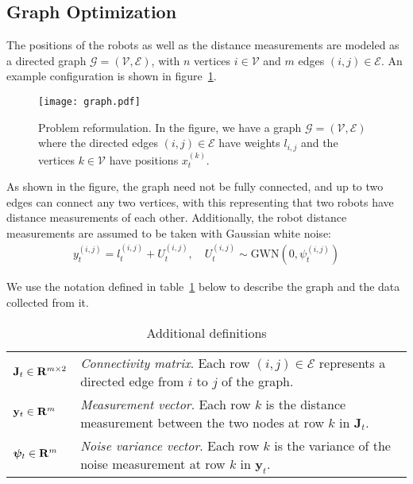 \subsection{Graph Optimization} \label{sec:graphs}
The positions of the robots as well as the distance measurements are modeled as a directed graph $\mathcal{G} = (\mathcal{V}, \mathcal{E})$, with $n$ vertices $i \in \mathcal{V}$ and $m$ edges $(i, j) \in \mathcal{E}$. An example configuration is shown in figure~\ref{fig:problem-graph}.
\begin{figure}[ht]
    \centering
    \texttt{[image: graph.pdf]}
    \caption{Problem reformulation. In the figure, we have a graph $\mathcal{G}=(\mathcal{V}, \mathcal{E})$ where the directed edges $(i, j) \in \mathcal{E}$ have weights $l_{i,j}$ and the vertices $k \in \mathcal{V}$ have positions $x^{(k)}_t$.}
    \label{fig:problem-graph} 
\end{figure}
As shown in the figure, the graph need not be fully connected, and up to two edges can connect any two vertices, with this representing that two robots have distance measurements of each other. Additionally, the robot distance measurements are assumed to be taken with Gaussian white noise: 
\begin{align}
    y_t^{(i, j)} = l_t^{(i,j)} + U_t^{(i, j)}, \quad U_t^{(i, j)} \sim \text{GWN}(0, \psi_t^{(i, j)})
\end{align}

We use the notation defined in table~\ref{tab:notation} below to describe the graph and the data collected from it.
\FloatBarrier
\begin{table}[ht]
    \centering
    \caption{Additional definitions}
    \label{tab:notation}
    \begin{tabularx}{\linewidth}{lX}
        $\mathbf{J}_t \in \mathbf{R}^{m \times 2}$ & 
        \textit{Connectivity matrix}.  Each row $(i, j)\in\mathcal{E}$ represents a directed edge from $i$ to $j$ of the graph. \\
        $\mathbf{y}_t \in \mathbf{R}^{m}$ & 
        \textit{Measurement vector}. Each row $k$ is the distance measurement between the two nodes at row $k$ in $\mathbf{J}_t$. \\
        $\bm{\psi}_t \in \mathbf{R}^{m}$ &
        \textit{Noise variance vector}. Each row $k$ is the variance of the noise measurement at row $k$ in $\mathbf{y}_t$. 
    \end{tabularx}
\end{table}
